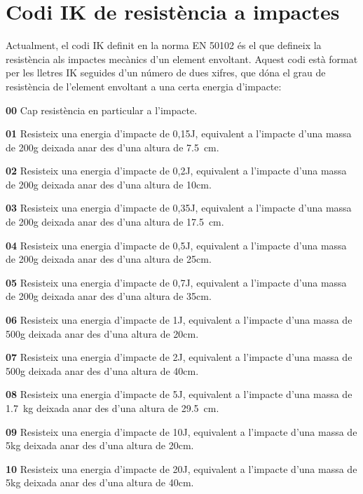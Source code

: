 \section{Codi IK de resistència a impactes}   

Actualment, el codi IK definit en la norma EN 50102 és el que defineix la resistència  als impactes mecànics d'un element  envoltant. Aquest codi està format per les lletres IK seguides d'un número de dues xifres, que dóna el grau de resistència de l'element envoltant a una certa energia d'impacte:

\begin{list}{}
   {\setlength{\labelwidth}{10mm} \setlength{\leftmargin}{10mm} \setlength{\labelsep}{2mm}}
   \item[\textbf{00}] Cap resistència en particular a l'impacte.
   \item[\textbf{01}] Resisteix una energia d'impacte de 0,15\unit{J}, equivalent a l'impacte d'una massa de 200\unit{g} deixada anar des d'una altura de \SI{7,5}{cm}.
   \item[\textbf{02}] Resisteix una energia d'impacte de 0,2\unit{J}, equivalent a l'impacte d'una massa de 200\unit{g} deixada anar des d'una altura de 10\unit{cm}.
   \item[\textbf{03}] Resisteix una energia d'impacte de 0,35\unit{J}, equivalent a l'impacte d'una massa de 200\unit{g} deixada anar des d'una altura de \SI{17,5}{cm}.
   \item[\textbf{04}] Resisteix una energia d'impacte de 0,5\unit{J}, equivalent a l'impacte d'una massa de 200\unit{g} deixada anar des d'una altura de 25\unit{cm}.
   \item[\textbf{05}] Resisteix una energia d'impacte de 0,7\unit{J}, equivalent a l'impacte d'una massa de 200\unit{g} deixada anar des d'una altura de 35\unit{cm}.
   \item[\textbf{06}]Resisteix una energia d'impacte de 1\unit{J}, equivalent a l'impacte d'una massa de 500\unit{g} deixada anar des d'una altura de 20\unit{cm}.
   \item[\textbf{07}]Resisteix una energia d'impacte de 2\unit{J}, equivalent a l'impacte d'una massa de 500\unit{g} deixada anar des d'una altura de 40\unit{cm}.
   \item[\textbf{08}]Resisteix una energia d'impacte de 5\unit{J}, equivalent a l'impacte d'una massa de \SI{1,7}{kg} deixada anar des d'una altura de \SI{29,5}{cm}.
   \item[\textbf{09}]Resisteix una energia d'impacte de 10\unit{J}, equivalent a l'impacte d'una massa de 5\unit{kg} deixada anar des d'una altura de 20\unit{cm}.
   \item[\textbf{10}]Resisteix una energia d'impacte de 20\unit{J}, equivalent a l'impacte d'una massa de 5\unit{kg} deixada anar des d'una altura de 40\unit{cm}.
\end{list}



